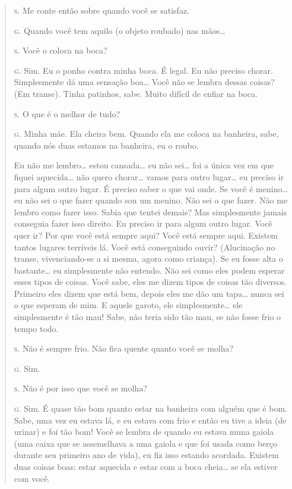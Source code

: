 \begin{quote}
\noindent\hskip0mm\textsc{s.} Me conte então sobre quando você se satisfaz.

\noindent\hskip0mm\textsc{g.} Quando você tem aquilo (o objeto roubado) nas mãos\ldots{}

\noindent\hskip0mm\textsc{s.} Você o coloca na boca?

\noindent\hskip0mm\textsc{g.} Sim. Eu o ponho contra minha boca. É legal. Eu não preciso chorar.
Simplesmente dá uma sensação boa\ldots{} Você não se lembra dessas coisas?
(Em transe). Tinha patinhos, sabe. Muito difícil de enfiar na boca.

\noindent\hskip0mm\textsc{s.} O que é o melhor de tudo?

\noindent\hskip0mm\textsc{g.} Minha mãe. Ela cheira bem. Quando ela me coloca na banheira, sabe,
quando nós duas estamos na banheira, eu o roubo.

Eu não me lembro\ldots{} estou cansada\ldots{} eu não sei\ldots{} foi a única vez
em que fiquei aquecida\ldots{} não quero chorar\ldots{} vamos para outro lugar\ldots{}
eu preciso ir para algum outro lugar. É preciso saber o que vai onde.
Se você é menino\ldots{} eu não sei o que fazer quando sou um menino. Não
sei o que fazer. Não me lembro como fazer isso. Sabia que tentei
demais? Mas simplesmente jamais conseguia fazer isso direito. Eu
preciso ir para algum outro lugar. Você quer ir? Por que você está
sempre aqui? Você está sempre aqui. Existem tantos lugares terríveis
lá. Você está conseguindo ouvir? (Alucinação\idxaluci{} no transe, vivenciando-se
a si mesma, agora como criança). Se eu fosse alta o bastante\ldots{} eu
simplesmente não entendo. Não sei como eles podem esperar esses tipos
de coisas. Você sabe, eles me dizem tipos de coisas tão diversos.
Primeiro eles dizem que está bem, depois eles me dão um tapa\ldots{} nunca
sei o que esperam de mim. E aquele garoto, ele simplesmente\ldots{} ele
simplesmente é tão mau! Sabe, não teria sido tão mau, se não fosse frio
o tempo todo.

\noindent\hskip0mm\textsc{s.} Não é sempre frio. Não fica quente quanto você se molha?

\noindent\hskip0mm\textsc{g.} Sim.

\noindent\hskip0mm\textsc{s.} Não é por isso que você se molha?

\noindent\hskip0mm\textsc{g.} Sim. É quase tão bom quanto estar na banheira com alguém que é bom.
Sabe, uma vez eu estava lá, e eu estava com frio e então eu tive a
ideia (de urinar) e foi tão bom! Você se lembra de quando eu estava
numa gaiola (uma caixa que se assemelhava a uma gaiola e que foi usada
como berço durante seu primeiro ano de vida), eu fiz isso estando
acordada. Existem duas coisas boas: estar aquecida e estar com a boca
cheia\ldots{} se ela estiver com você.


\end{quote}

